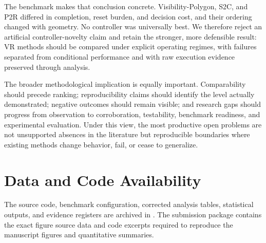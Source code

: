 The benchmark makes that conclusion concrete. Visibility-Polygon, S2C, and P2R differed in completion, reset burden, and decision cost, and their ordering changed with geometry. No controller was universally best. We therefore reject an artificial controller-novelty claim and retain the stronger, more defensible result: VR methods should be compared under explicit operating regimes, with failures separated from conditional performance and with raw execution evidence preserved through analysis.

The broader methodological implication is equally important. Comparability should precede ranking; reproducibility claims should identify the level actually demonstrated; negative outcomes should remain visible; and research gaps should progress from observation to corroboration, testability, benchmark readiness, and experimental evaluation. Under this view, the most productive open problems are not unsupported absences in the literature but reproducible boundaries where existing methods change behavior, fail, or cease to generalize.

\section*{Data and Code Availability}
The source code, benchmark configuration, corrected analysis tables, statistical outputs, and evidence registers are archived in \repo{}. The submission package contains the exact figure source data and code excerpts required to reproduce the manuscript figures and quantitative summaries.
